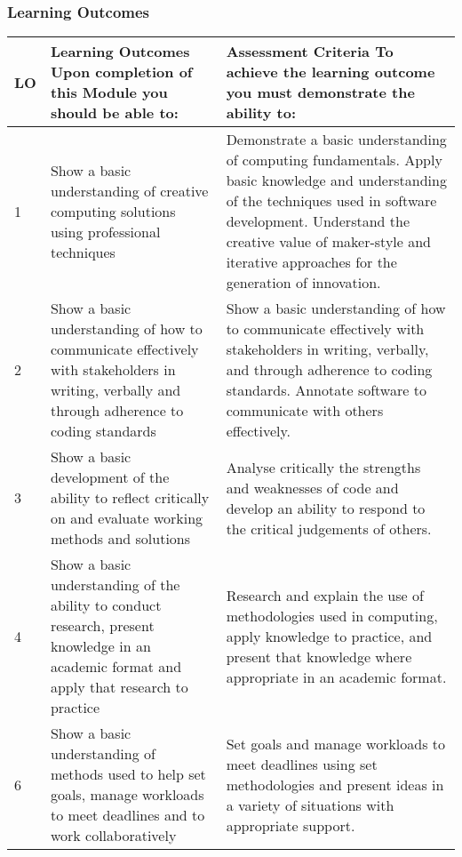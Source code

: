 \documentclass[handout, xcolor={dvipsnames}]{beamer}\usepackage{etoolbox}\newtoggle{printable}\toggletrue{printable}
\begin{document}
\begin{frame}
	\frametitle{Learning Outcomes}

	\centering
		\tiny
		\begin{tabular} { | p{} | p{} | p{} |}
 			LO &
			\textbf{Learning Outcomes} Upon completion of this Module you should be able to: &  
			\textbf{Assessment Criteria} To achieve the learning outcome you must demonstrate the ability to: \\
			\hline
 			1 &
			Show a basic understanding of creative computing solutions using professional techniques  &  
			Demonstrate a basic understanding of computing fundamentals. Apply basic knowledge and understanding of the techniques used in software development. Understand the creative value of maker-style and iterative approaches for the generation of innovation. \\
 			2 &
			Show a basic understanding of how to communicate effectively with stakeholders in writing, verbally and through adherence to coding standards &  
			Show a basic understanding of how to communicate effectively with stakeholders in writing, verbally, and through adherence to coding standards. Annotate software to communicate with others effectively. \\
 			3 &
			Show a basic development of the ability to reflect critically on and evaluate working methods and solutions  & 
			Analyse critically the strengths and weaknesses of code and develop an ability to respond to the critical judgements of others. \\
 			4 &
			Show a basic understanding of the ability to conduct research, present knowledge in an academic format and apply that research to practice  & 
			Research and explain the use of methodologies used in computing, apply knowledge to practice, and present that knowledge where appropriate in an academic format. \\
 			6 &
			Show a basic understanding of methods used to help set goals, manage workloads to meet deadlines and to work collaboratively  & 
			Set goals and manage workloads to meet deadlines using set methodologies and present ideas in a variety of situations with appropriate support. 
		\end{tabular}

	
\end{frame}
\end{document}
